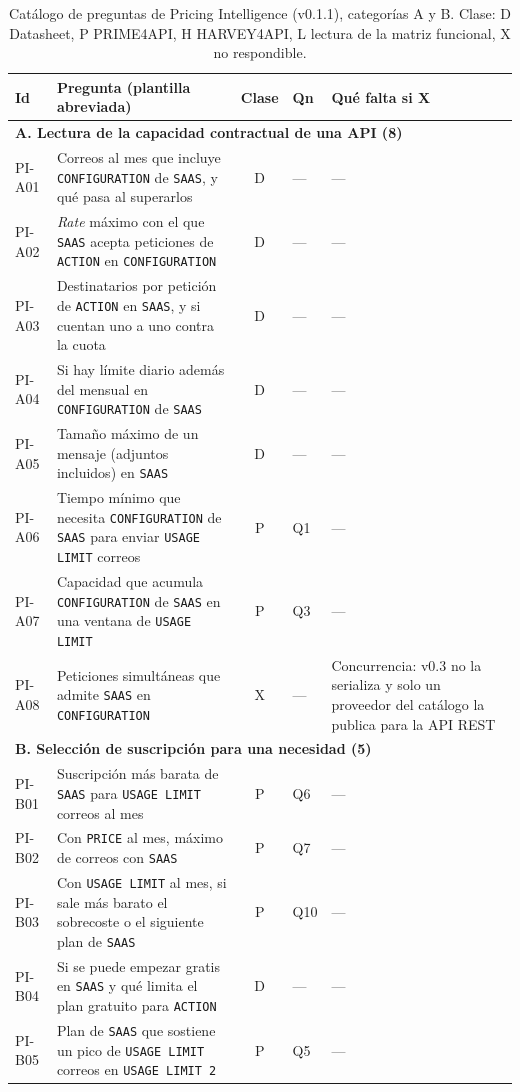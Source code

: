 \begin{table}[H]
\centering
\small
\begin{tabular}{|l|p{5.4cm}|c|p{2.3cm}|p{3.1cm}|}
\hline
\textbf{Id} & \textbf{Pregunta (plantilla abreviada)} & \textbf{Clase} &
\textbf{Qn} & \textbf{Qué falta si X} \\
\hline
\multicolumn{5}{|l|}{\textbf{A. Lectura de la capacidad contractual de una API (8)}} \\
\hline
PI-A01 & Correos al mes que incluye \texttt{CONFIGURATION} de \texttt{SAAS}, y qué pasa al superarlos & D & --- & --- \\
\hline
PI-A02 & \textit{Rate} máximo con el que \texttt{SAAS} acepta peticiones de \texttt{ACTION} en \texttt{CONFIGURATION} & D & --- & --- \\
\hline
PI-A03 & Destinatarios por petición de \texttt{ACTION} en \texttt{SAAS}, y si cuentan uno a uno contra la cuota & D & --- & --- \\
\hline
PI-A04 & Si hay límite diario además del mensual en \texttt{CONFIGURATION} de \texttt{SAAS} & D & --- & --- \\
\hline
PI-A05 & Tamaño máximo de un mensaje (adjuntos incluidos) en \texttt{SAAS} & D & --- & --- \\
\hline
PI-A06 & Tiempo mínimo que necesita \texttt{CONFIGURATION} de \texttt{SAAS} para enviar \texttt{USAGE LIMIT} correos & P & Q1 & --- \\
\hline
PI-A07 & Capacidad que acumula \texttt{CONFIGURATION} de \texttt{SAAS} en una ventana de \texttt{USAGE LIMIT} & P & Q3 & --- \\
\hline
PI-A08 & Peticiones simultáneas que admite \texttt{SAAS} en \texttt{CONFIGURATION} & X & --- & Concurrencia: v0.3 no la serializa y solo un proveedor del catálogo la publica para la API REST \\
\hline
\multicolumn{5}{|l|}{\textbf{B. Selección de suscripción para una necesidad (5)}} \\
\hline
PI-B01 & Suscripción más barata de \texttt{SAAS} para \texttt{USAGE LIMIT} correos al mes & P & Q6 & --- \\
\hline
PI-B02 & Con \texttt{PRICE} al mes, máximo de correos con \texttt{SAAS} & P & Q7 & --- \\
\hline
PI-B03 & Con \texttt{USAGE LIMIT} al mes, si sale más barato el sobrecoste o el siguiente plan de \texttt{SAAS} & P & Q10 & --- \\
\hline
PI-B04 & Si se puede empezar gratis en \texttt{SAAS} y qué limita el plan gratuito para \texttt{ACTION} & D & --- & --- \\
\hline
PI-B05 & Plan de \texttt{SAAS} que sostiene un pico de \texttt{USAGE LIMIT} correos en \texttt{USAGE LIMIT 2} & P & Q5 & --- \\
\hline
\end{tabular}
\caption{Catálogo de preguntas de Pricing Intelligence (v0.1.1), categorías A y B. Clase: D
Datasheet, P PRIME4API, H HARVEY4API, L lectura de la matriz funcional, X no respondible.}
\label{tab:catalogo-pi-1}
\end{table}

